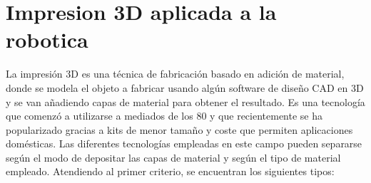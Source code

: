 \section{Impresion 3D aplicada a la robotica}
\label{impresion_3D}

La impresión 3D es una técnica de fabricación basado en adición de material, donde se modela el objeto a fabricar usando algún software de diseño CAD en 3D y se van añadiendo capas de material para obtener el resultado. Es una tecnología que comenzó a utilizarse a mediados de los 80 y que recientemente se ha popularizado gracias a kits de menor tamaño y coste que permiten aplicaciones domésticas. Las diferentes tecnologías empleadas en este campo pueden separarse según el modo de depositar las capas de material y según el tipo de material empleado. Atendiendo al primer criterio, se encuentran  los siguientes tipos:\\

